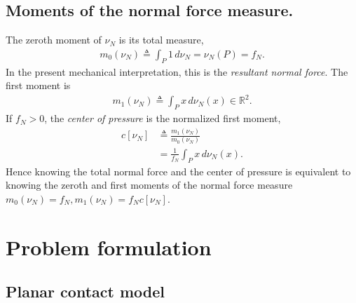 \documentclass[11pt,a4paper]{article}
\theoremstyle{proposition}
\begin{document}
\subsection{Moments of the normal force measure.}
The zeroth moment of $\nu_N$ is its total measure,
\begin{align}
m_0(\nu_N) \triangleq \int_P 1\,d\nu_N = \nu_N(P) = f_N.
\end{align}
In the present mechanical interpretation, this is the \textit{resultant normal force}. The first moment is
\begin{align}
m_1(\nu_N) \triangleq \int_P x\,d\nu_N(x)\in\mathbb R^2.
\end{align}
If $f_N>0$, the \textit{center of pressure} is the normalized first moment, 
\begin{align} 
c[\nu_N] &\triangleq \frac{m_1(\nu_N)}{m_0(\nu_N)} \\
         & = \frac{1}{f_N} \int_P x\,d\nu_N(x).
\end{align}
Hence knowing the total normal force and the center of pressure is equivalent to knowing the zeroth and first moments of the normal force measure $m_0(\nu_N)=f_N, m_1(\nu_N)=f_Nc[\nu_N]$. 

\section{Problem formulation}
\subsection{Planar contact model}
\end{document}
